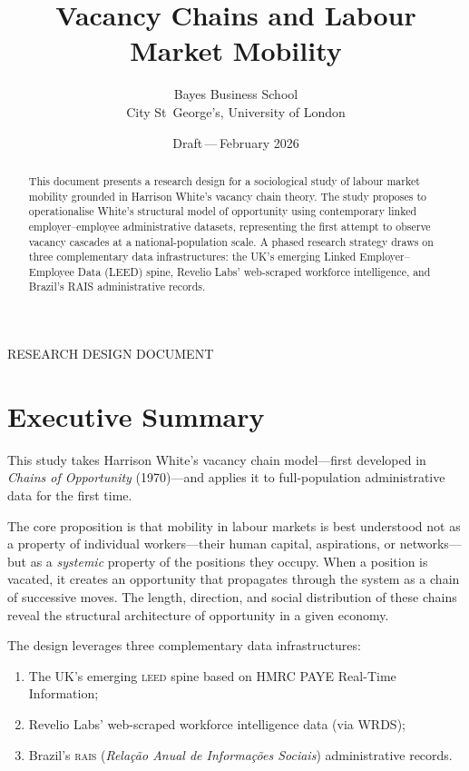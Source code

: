 \documentclass[a4paper]{tufte-handout}
\title{Vacancy Chains and Labour Market Mobility}
\author{%
  Bayes Business School\\
  City St~George's, University of London%
}
\date{Draft\,---\,February 2026}
\begin{document}
\maketitle

\noindent\textcolor{medgray}{\small\textsf{RESEARCH DESIGN DOCUMENT}}\par
\medskip

\begin{abstract}
	\noindent
	This document presents a research design for a sociological study of labour
	market mobility grounded in Harrison White's vacancy chain theory. The study
	proposes to operationalise White's structural model of opportunity using
	contemporary linked employer--employee administrative datasets, representing
	the first attempt to observe vacancy cascades at a national-population scale. A
	phased research strategy draws on three complementary data infrastructures: the
	UK's emerging Linked Employer--Employee Data (LEED) spine, Revelio Labs'
	web-scraped workforce intelligence, and Brazil's RAIS administrative records.
\end{abstract}

\section{Executive Summary}

This study takes Harrison White's vacancy chain model---first developed in
\emph{Chains of Opportunity} (1970)---and applies it to full-population
administrative data for the first time.

The core proposition is that mobility in labour markets is best understood not
as a property of individual workers---their human capital, aspirations, or
networks---but as a \emph{systemic} property of the positions they occupy. When
a position is vacated, it creates an opportunity that propagates through the
system as a chain of successive moves. The length, direction, and social
distribution of these chains reveal the structural architecture of opportunity
in a given economy.

The design leverages three complementary data infrastructures:
\begin{enumerate}
	\item The UK's emerging \textsc{leed} spine based on HMRC PAYE Real-Time Information;
	\item Revelio Labs' web-scraped workforce intelligence data (via WRDS);
	\item Brazil's \textsc{rais} (\emph{Relação Anual de Informações Sociais}) administrative records.
\end{enumerate}
\end{document}
